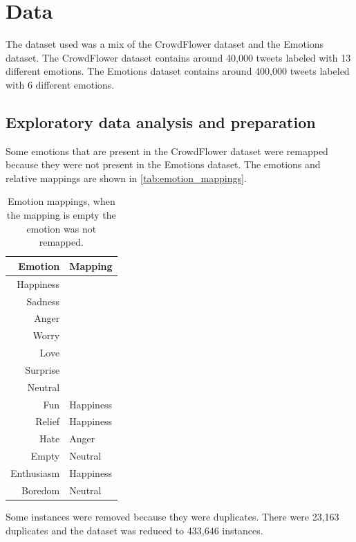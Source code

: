 \section{Data}
\label{sec:data}
The dataset used was a mix of the CrowdFlower 
dataset\cite{crowdflower_dataset} and the
Emotions dataset\cite{emotions_dataset}.
The CrowdFlower dataset contains around 40,000 tweets
labeled with 13 different emotions. The Emotions 
dataset contains around 400,000 tweets labeled with 6 
different emotions.

\subsection{Exploratory data analysis and preparation}
Some emotions that are present in the
CrowdFlower dataset were remapped because they
were not present in the Emotions dataset.
The emotions and relative mappings are shown
in \autoref{tab:emotion_mappings}.

\begin{table}[H]
    \centering
    \begin{tabular}{|r|l|}
        \hline
        Emotion & Mapping \\
        \hline
        Happiness & \\
        Sadness & \\
        Anger & \\
        Worry & \\
        Love & \\
        Surprise & \\
        Neutral & \\
        Fun  & Happiness \\
        Relief  & Happiness \\
        Hate  & Anger \\
        Empty  & Neutral \\
        Enthusiasm  & Happiness \\
        Boredom  & Neutral \\
        \hline
    \end{tabular}
    \caption{Emotion mappings, when the mapping is empty the emotion was not remapped.}
    \label{tab:emotion_mappings}
\end{table}

Some instances were removed because they were
duplicates. There were 23,163 duplicates and the
dataset was reduced to 433,646 instances.

